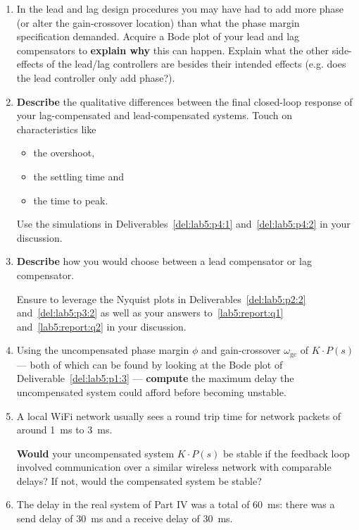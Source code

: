 \begin{deliverable}[label={lab5:report}]
  \begin{enumerate}[label={(\arabic*)}]
     \item{%
       In the lead and lag design procedures you may have had to add more phase (or alter the gain-crossover location) than what the phase margin specification demanded.
       Acquire a Bode plot of your lead and lag compensators to \textbf{explain why} this can happen.
       Explain what the other side-effects of the lead/lag controllers are besides their intended effects (e.g. does the lead controller only add phase?).
       \label{lab5:report:q1}
     }
    \item{%
      \textbf{Describe} the qualitative differences between the final closed-loop response of your lag-compensated and lead-compensated systems.
      Touch on characteristics like
      \begin{itemize}
        \item{
          the overshoot,
        }
        \item{
          the settling time and
        }
        \item{
          the time to peak.
        }
      \end{itemize}
      Use the simulations in Deliverables~\ref{del:lab5:p4:1} and~\ref{del:lab5:p4:2} in your discussion.
      \label{lab5:report:q2}
    }
    \item{%
      \textbf{Describe} how you would choose between a lead compensator or lag compensator.

      Ensure to leverage the Nyquist plots in Deliverables~\ref{del:lab5:p2:2} and~\ref{del:lab5:p3:2} as well as your answers to~\ref{lab5:report:q1} and~\ref{lab5:report:q2} in your discussion.

      \label{lab5:report:q3}
    }
    \item{%
      Using the uncompensated phase margin \(\phi\) and gain-crossover \(\omega_\mathrm{gc}\) of \(K \cdot P(s)\) --- both of which can be found by looking at the Bode plot of Deliverable~\ref{del:lab5:p1:3} --- \textbf{compute} the maximum delay
      the uncompensated system could afford before becoming unstable.
      \label{lab5:report:q4}
    }
    \item{%
      A local WiFi network usually sees a round trip time for network packets of around \SI{1}{\milli\second} to \SI{3}{\milli\second}.

      \textbf{Would} your uncompensated system \(K \cdot P(s)\) be stable if the feedback loop involved communication over a similar wireless network with comparable delays?
      If not, would the compensated system be stable?
      \label{lab5:report:q5}
    }
    \item{%
      The delay in the real system of Part IV was a total of \SI{60}{\milli\second}:
      there was a send delay of \SI{30}{\milli\second} and a receive delay of \SI{30}{\milli\second}.

}
\end{enumerate}
\end{deliverable}
